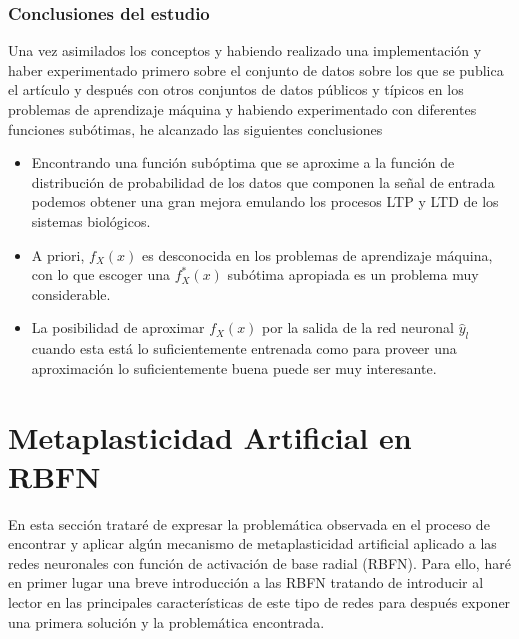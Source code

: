 \documentclass[10pt,a4paper]{report}
\begin{document}
\subsubsection{Conclusiones del estudio}
Una vez asimilados los conceptos y habiendo realizado una implementación y haber experimentado primero sobre el conjunto de datos sobre los que se publica el artículo y después con otros conjuntos de datos públicos y típicos en los problemas de aprendizaje máquina y habiendo experimentado con diferentes funciones subótimas, he alcanzado las siguientes conclusiones
\begin{itemize}
	\item Encontrando una función subóptima que se aproxime a la función de distribución de probabilidad de los datos que componen la señal de entrada podemos obtener una gran mejora emulando los procesos LTP y LTD de los sistemas biológicos.
	\item A priori, $f_X(x)$ es desconocida en los problemas de aprendizaje máquina, con lo que escoger una $f^*_X(x)$ subótima apropiada es un problema muy considerable.
	\item La posibilidad de aproximar $f_X(x)$ por la salida de la red neuronal $\widehat{y}_l$ cuando esta está lo suficientemente entrenada como para proveer una aproximación lo suficientemente buena puede ser muy interesante.
\end{itemize}

\section{Metaplasticidad Artificial en RBFN}
En esta sección trataré de expresar la problemática observada en el proceso de encontrar y aplicar algún mecanismo de metaplasticidad artificial aplicado a las redes neuronales con función de activación de base radial (RBFN). Para ello, haré en primer lugar una breve introducción a las RBFN tratando de introducir al lector en las principales características de este tipo de redes para después exponer una primera solución y la problemática encontrada.
\end{document}
